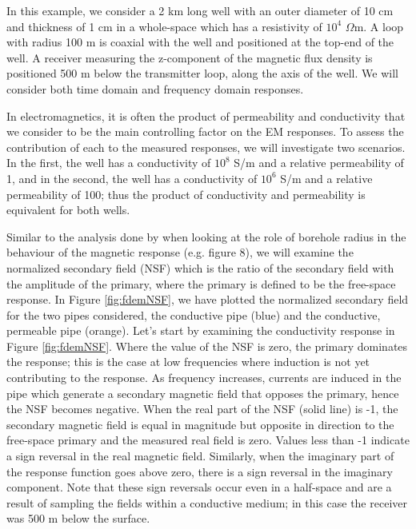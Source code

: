 \documentclass[preprint,review,3p,times,onecolumn,authoryear]{elsarticle}
\begin{document}
In this example, we consider a 2 km long well with an outer diameter of 10 cm and thickness of 1 cm in a whole-space which has a resistivity of $10^4$ $\Omega$m. A loop with radius 100 m is coaxial with the well and positioned at the top-end of the well. A receiver measuring the z-component of the magnetic flux density is positioned 500 m below the transmitter loop, along the axis of the well. We will consider both time domain and frequency domain responses.

In electromagnetics, it is often the product of permeability and conductivity that we consider to be the main controlling factor on the EM responses. To assess the contribution of each to the measured responses, we will investigate two scenarios. In the first, the well has a conductivity of $10^8$ S/m and a relative permeability of 1, and in the second, the well has a conductivity of $10^6$ S/m and a relative permeability of 100; thus the product of conductivity and permeability is equivalent for both wells.

Similar to the analysis done by \cite{Augustin1989} when looking at the role of borehole radius in the behaviour of the magnetic response (e.g. figure 8), we will examine the normalized secondary field (NSF) which is the ratio of the secondary field with the amplitude of the primary, where the primary is defined to be the free-space response. In Figure \ref{fig:fdemNSF}, we have plotted the normalized secondary field for the two pipes considered, the conductive pipe (blue) and the conductive, permeable pipe (orange). Let's start by examining the conductivity response in Figure \ref{fig:fdemNSF}. Where the value of the NSF is zero, the primary dominates the response; this is the case at low frequencies where induction is not yet contributing to the response. As frequency increases, currents are induced in the pipe which generate a secondary magnetic field that opposes the primary, hence the NSF becomes negative. When the real part of the NSF (solid line) is -1, the secondary magnetic field is equal in magnitude but opposite in direction to the free-space primary and the measured real field is zero. Values less than -1 indicate a sign reversal in the real magnetic field. Similarly, when the imaginary part of the response function goes above zero, there is a sign reversal in the imaginary component. Note that these sign reversals occur even in a half-space and are a result of sampling the fields within a conductive medium; in this case the receiver was 500 m below the surface.
\end{document}
